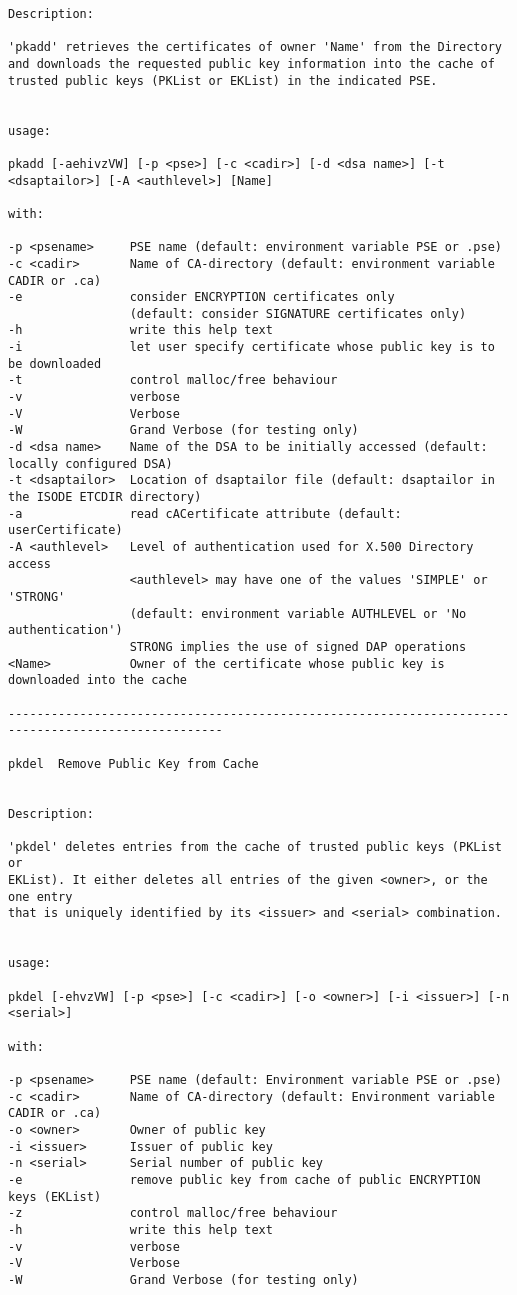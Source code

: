 {\begin{verbatim}
Description:

'pkadd' retrieves the certificates of owner 'Name' from the Directory
and downloads the requested public key information into the cache of
trusted public keys (PKList or EKList) in the indicated PSE.


usage:

pkadd [-aehivzVW] [-p <pse>] [-c <cadir>] [-d <dsa name>] [-t <dsaptailor>] [-A <authlevel>] [Name]

with:

-p <psename>     PSE name (default: environment variable PSE or .pse)
-c <cadir>       Name of CA-directory (default: environment variable CADIR or .ca)
-e               consider ENCRYPTION certificates only
                 (default: consider SIGNATURE certificates only)
-h               write this help text
-i               let user specify certificate whose public key is to be downloaded
-t               control malloc/free behaviour
-v               verbose
-V               Verbose
-W               Grand Verbose (for testing only)
-d <dsa name>    Name of the DSA to be initially accessed (default: locally configured DSA)
-t <dsaptailor>  Location of dsaptailor file (default: dsaptailor in the ISODE ETCDIR directory)
-a               read cACertificate attribute (default: userCertificate)
-A <authlevel>   Level of authentication used for X.500 Directory access
                 <authlevel> may have one of the values 'SIMPLE' or 'STRONG'
                 (default: environment variable AUTHLEVEL or 'No authentication')
                 STRONG implies the use of signed DAP operations
<Name>           Owner of the certificate whose public key is downloaded into the cache

----------------------------------------------------------------------------------------------------

pkdel  Remove Public Key from Cache


Description:

'pkdel' deletes entries from the cache of trusted public keys (PKList or
EKList). It either deletes all entries of the given <owner>, or the one entry
that is uniquely identified by its <issuer> and <serial> combination.


usage:

pkdel [-ehvzVW] [-p <pse>] [-c <cadir>] [-o <owner>] [-i <issuer>] [-n <serial>]

with:

-p <psename>     PSE name (default: Environment variable PSE or .pse)
-c <cadir>       Name of CA-directory (default: Environment variable CADIR or .ca)
-o <owner>       Owner of public key
-i <issuer>      Issuer of public key
-n <serial>      Serial number of public key
-e               remove public key from cache of public ENCRYPTION keys (EKList)
-z               control malloc/free behaviour
-h               write this help text
-v               verbose
-V               Verbose
-W               Grand Verbose (for testing only)


\end{verbatim}}
